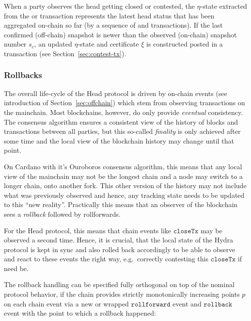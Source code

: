\quad When a party observes
the head getting closed or contested, the $\eta$-state extracted from the
\mtxClose{} or \mtxContest{} transaction represents the latest head status that
has been aggregated on-chain so far (by a sequence of \mtxClose{} and
\mtxContest{} transactions). If the last confirmed (off-chain) snapshot is newer
than the observed (on-chain) snapshot number $s_{c}$, an updated $\eta$-state
and certificate $\xi$ is constructed posted in a \mtxContest{} transaction (see
Section~\ref{sec:contest-tx}).

\subsubsection{Rollbacks}\label{sec:rollbacks}

The overall life-cycle of the Head protocol is driven by on-chain events (see
introduction of Section~\ref{sec:offchain}) which stem from observing
transactions on the mainchain. Most blockchains, however, do only provide
\emph{eventual} consistency. The consensus algorithm ensures a consistent view
of the history of blocks and transactions between all parties, but this
so-called \emph{finality} is only achieved after some time and the local view of
the blockchain history may change until that point.

On Cardano with it's Ouroboros consensus algorithm, this means that any local
view of the mainchain may not be the longest chain and a node may switch to a
longer chain, onto another fork. This other version of the history may not
include what was previously observed and hence, any tracking state needs to be
updated to this ``new reality''. Practically this means that an observer of the
blockchain sees a \emph{rollback} followed by rollforwards.

For the Head protocol, this means that chain events like $\mathtt{closeTx}$ may
be observed a second time. Hence, it is crucial, that the local state of the
Hydra protocol is kept in sync and also rolled back accordingly to be able to
observe and react to these events the right way, e.g.\ correctly contesting this
$\mathtt{closeTx}$ if need be.

The rollback handling can be specified fully orthogonal on top of the nominal
protocol behavior, if the chain provides strictly monotonically increasing
points $p$ on each chain event via a new or wrapped $\mathtt{rollforward}$
event and $\mathtt{rollback}$ event with the point to which a rollback happened:\\

